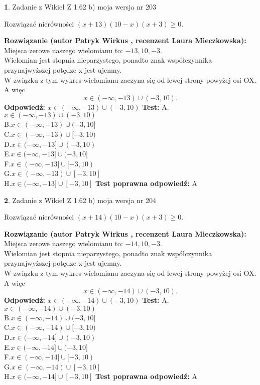 \documentclass[12pt, a4paper]{article}
\theoremstyle{definition} %
\newtheorem{zad}{}
\newcommand{\zadStart}[1]{\begin{zad}#1\newline}
\newcommand{\zadStop}{\end{zad}}
\newcommand{\rozwStart}[2]{\noindent \textbf{Rozwiązanie (autor #1 , recenzent #2): }\newline}
\newcommand{\rozwStop}{\newline}
\newcommand{\odpStart}{\noindent \textbf{Odpowiedź:}\newline}
\newcommand{\odpStop}{\newline}
\newcommand{\testStart}{\noindent \textbf{Test:}\newline}
\newcommand{\testStop}{\newline}
\newcommand{\kluczStart}{\noindent \textbf{Test poprawna odpowiedź:}\newline}
\newcommand{\kluczStop}{\newline}
\begin{document}
\zadStart{Zadanie z Wikieł Z 1.62 b) moja wersja nr 203}

Rozwiązać nierówności $(x+13)(10-x)(x+3)\ge0$.
\zadStop
\rozwStart{Patryk Wirkus}{Laura Mieczkowska}
Miejsca zerowe naszego wielomianu to: $-13, 10, -3$.\\
Wielomian jest stopnia nieparzystego, ponadto znak współczynnika przy\linebreak najwyższej potędze x jest ujemny.\\ W związku z tym wykres wielomianu zaczyna się od lewej strony powyżej osi OX. A więc $$x \in (-\infty,-13) \cup (-3,10).$$
\rozwStop
\odpStart
$x \in (-\infty,-13) \cup (-3,10)$
\odpStop
\testStart
A.$x \in (-\infty,-13) \cup (-3,10)$\\
B.$x \in (-\infty,-13) \cup (-3,10]$\\
C.$x \in (-\infty,-13) \cup [-3,10)$\\
D.$x \in (-\infty,-13] \cup (-3,10)$\\
E.$x \in (-\infty,-13] \cup (-3,10]$\\
F.$x \in (-\infty,-13] \cup [-3,10)$\\
G.$x \in (-\infty,-13) \cup [-3,10]$\\
H.$x \in (-\infty,-13] \cup [-3,10]$
\testStop
\kluczStart
A
\kluczStop



\zadStart{Zadanie z Wikieł Z 1.62 b) moja wersja nr 204}

Rozwiązać nierówności $(x+14)(10-x)(x+3)\ge0$.
\zadStop
\rozwStart{Patryk Wirkus}{Laura Mieczkowska}
Miejsca zerowe naszego wielomianu to: $-14, 10, -3$.\\
Wielomian jest stopnia nieparzystego, ponadto znak współczynnika przy\linebreak najwyższej potędze x jest ujemny.\\ W związku z tym wykres wielomianu zaczyna się od lewej strony powyżej osi OX. A więc $$x \in (-\infty,-14) \cup (-3,10).$$
\rozwStop
\odpStart
$x \in (-\infty,-14) \cup (-3,10)$
\odpStop
\testStart
A.$x \in (-\infty,-14) \cup (-3,10)$\\
B.$x \in (-\infty,-14) \cup (-3,10]$\\
C.$x \in (-\infty,-14) \cup [-3,10)$\\
D.$x \in (-\infty,-14] \cup (-3,10)$\\
E.$x \in (-\infty,-14] \cup (-3,10]$\\
F.$x \in (-\infty,-14] \cup [-3,10)$\\
G.$x \in (-\infty,-14) \cup [-3,10]$\\
H.$x \in (-\infty,-14] \cup [-3,10]$
\testStop
\kluczStart
A
\kluczStop
\end{document}
